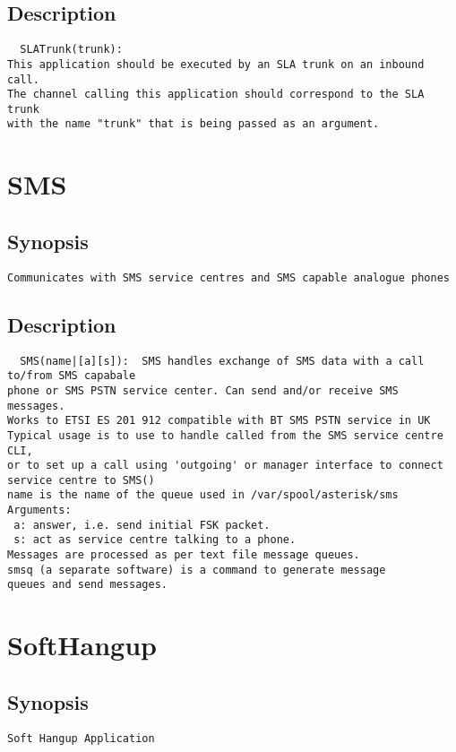 \subsection{Description}
\begin{verbatim}
  SLATrunk(trunk):
This application should be executed by an SLA trunk on an inbound call.
The channel calling this application should correspond to the SLA trunk
with the name "trunk" that is being passed as an argument.

\end{verbatim}


\section{SMS}
\subsection{Synopsis}
\begin{verbatim}
Communicates with SMS service centres and SMS capable analogue phones
\end{verbatim}
\subsection{Description}
\begin{verbatim}
  SMS(name|[a][s]):  SMS handles exchange of SMS data with a call to/from SMS capabale
phone or SMS PSTN service center. Can send and/or receive SMS messages.
Works to ETSI ES 201 912 compatible with BT SMS PSTN service in UK
Typical usage is to use to handle called from the SMS service centre CLI,
or to set up a call using 'outgoing' or manager interface to connect
service centre to SMS()
name is the name of the queue used in /var/spool/asterisk/sms
Arguments:
 a: answer, i.e. send initial FSK packet.
 s: act as service centre talking to a phone.
Messages are processed as per text file message queues.
smsq (a separate software) is a command to generate message
queues and send messages.

\end{verbatim}


\section{SoftHangup}
\subsection{Synopsis}
\begin{verbatim}
Soft Hangup Application
\end{verbatim}

